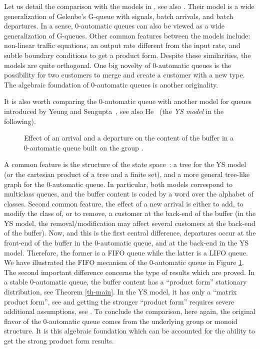 \documentclass[11pt,a4paper]{article}
\theoremstyle{remark}
\begin{document}
Let us detail the comparison with the models in \cite{CMPi},
see also \cite{ChMi00}. Their model is a wide generalization of
Gelenbe's G-queue with signals, batch arrivals, and batch departures. 
In a sense, 0-automatic queues can also be viewed as a wide
generalization of G-queues. Other common features between the models 
include: non-linear traffic equations, an output rate different from
the input rate, and subtle boundary conditions to get a product form. 
Despite these similarities, the models are quite orthogonal. 
One big novelty of 0-automatic queues is the possibility for
two customers to merge and create a customer with a new
type. The algebraic foundation of 0-automatic queues is another
originality. 

\medskip

It is also worth comparing the 0-automatic queue with another model for
queues introduced by Yeung and Sengupta~\cite{YeSe}, see also
He~\cite{he} (the {\em YS model} in the following). 

\begin{figure}[ht]

\caption{Effect of an arrival and a departure on the content of the
  buffer in a 0-automatic queue built on the group .}
\label{fi-0autmeca}
\end{figure}

A common feature is the structure of the state space~: a tree for the
YS model (or the cartesian product of a tree and a finite set), and a
more general tree-like graph for the 0-automatic queue. In particular,
both models correspond to multiclass queues, and the buffer content is
coded by a word over the alphabet of classes. Second common
feature, the effect of a new arrival is either to add, to modify
the class of, or to remove, a customer at the back-end of the buffer (in
the YS model, the removal/modification may affect several customers at
the back-end of the buffer). Now, and this is the first central
difference, departures occur at the front-end of the buffer in the
0-automatic queue, and at the back-end in the YS model. Therefore, the
former is a FIFO queue while the latter is a LIFO queue. We have
illustrated the FIFO mecanism of the 0-automatic queue in Figure
\ref{fi-0autmeca}. 
The second important difference concerns the type of results which are
proved. In a stable 0-automatic queue, the buffer content has a
``product form'' stationary distribution, see Theorem \ref{th-main}. In the YS
model, it has only a  ``matrix product form'', see \cite[Section 2]{YeSe} and getting the
stronger ``product form'' requires severe additional assumptions, see 
\cite[Section 6]{YeSe}. 
To conclude the comparison, here again, the original flavor of the
0-automatic queue comes from the underlying group or monoid structure. It is
this algebraic foundation which can be accounted for the ability 
to get the strong product form results. 
\end{document}
